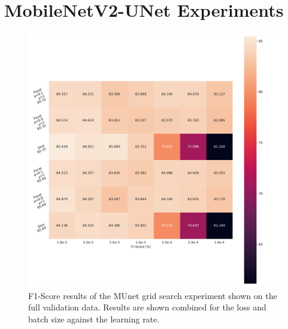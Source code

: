 \clearpage
\section{MobileNetV2-UNet Experiments}
\label{app:munet_experiments}

\begin{figure}[H]
\begin{center}
    \includegraphics[width=\columnwidth]{imgs/munet_grid_heat_F1_B.pdf}
    \caption{F1-Score results of the \ac{MUnet} grid search experiment shown on the full validation data. Results are shown combined for the loss and batch size against the learning rate.}
    \label{fig:munet_f1b_heat}
\end{center}
\end{figure}

